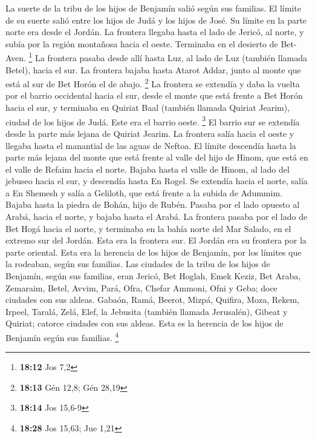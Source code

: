 \begin{paracol}{2}
 La suerte de la tribu de los hijos de Benjamín salió
según sus familias. El límite de su suerte salió entre los hijos de Judá
y los hijos de José.  Su límite en la parte norte era
desde el Jordán. La frontera llegaba hasta el lado de Jericó, al norte,
y subía por la región montañosa hacia el oeste. Terminaba en el desierto
de Bet-Aven. \footnote{\textbf{18:12} Jos 7,2}  La
frontera pasaba desde allí hasta Luz, al lado de Luz (también llamada
Betel), hacia el sur. La frontera bajaba hasta Atarot Addar, junto al
monte que está al sur de Bet Horón el de abajo. \footnote{\textbf{18:13}
  Gén 12,8; Gén 28,19}  La frontera se extendía y daba la
vuelta por el barrio occidental hacia el sur, desde el monte que está
frente a Bet Horón hacia el sur, y terminaba en Quiriat Baal (también
llamada Quiriat Jearim), ciudad de los hijos de Judá. Este era el barrio
oeste. \footnote{\textbf{18:14} Jos 15,6-9}  El barrio
sur se extendía desde la parte más lejana de Quiriat Jearim. La frontera
salía hacia el oeste y llegaba hasta el manantial de las aguas de
Neftoa.  El límite descendía hasta la parte más lejana
del monte que está frente al valle del hijo de Hinom, que está en el
valle de Refaim hacia el norte. Bajaba hasta el valle de Hinom, al lado
del jebuseo hacia el sur, y descendía hasta En Rogel.  Se
extendía hacia el norte, salía a En Shemesh y salía a Geliloth, que está
frente a la subida de Adummim. Bajaba hasta la piedra de Bohán, hijo de
Rubén.  Pasaba por el lado opuesto al Arabá, hacia el
norte, y bajaba hasta el Arabá.  La frontera pasaba por
el lado de Bet Hogá hacia el norte, y terminaba en la bahía norte del
Mar Salado, en el extremo sur del Jordán. Esta era la frontera sur.
 El Jordán era su frontera por la parte oriental. Esta
era la herencia de los hijos de Benjamín, por los límites que la
rodeaban, según sus familias.  Las ciudades de la tribu
de los hijos de Benjamín, según sus familias, eran Jericó, Bet Hoglah,
Emek Keziz,  Bet Araba, Zemaraim, Betel, 
Avvim, Pará, Ofra,  Chefar Ammoni, Ofni y Geba; doce
ciudades con sus aldeas.  Gabaón, Ramá, Beerot,
 Mizpá, Quifira, Moza,  Rekem, Irpeel,
Taralá,  Zelá, Elef, la Jebusita (también llamada
Jerusalén), Gibeat y Quiriat; catorce ciudades con sus aldeas. Esta es
la herencia de los hijos de Benjamín según sus familias. \footnote{\textbf{18:28}
  Jos 15,63; Jue 1,21}


\end{paracol}
